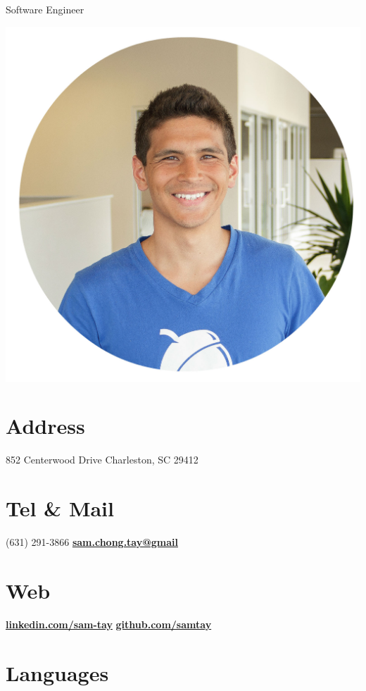 \documentclass[]{friggeri-cv}
\begin{document}
      {Software Engineer}


\begin{aside}
  \includegraphics[scale=0.071]{img/samtay2.jpg}
  \section{Address}
    852 Centerwood Drive
    Charleston, SC 29412
    ~
  \section{Tel \& Mail}
    (631) 291-3866
    \href{mailto:sam.chong.tay@gmail.com}{\textbf{sam.chong.tay@gmail}}
    ~
  \section{Web}
    \href{https://www.linkedin.com/in/sam-tay}{\textbf{linkedin.com/sam-tay}}
    \href{https://github.com/samtay}{\textbf{github.com/samtay}}
    ~
  \section{Languages}
    ~

\end{aside}
\end{document}
